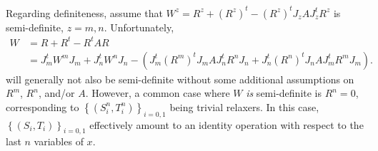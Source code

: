 \documentclass{article}
\begin{document}
Regarding definiteness, assume that $W^z = R^z + \left( R^z \right)^t - \left( R^z \right)^t J_z A J_z^t R^z$ is semi-definite, $z = m,n$. Unfortunately,
\begin{align*}
W & = R + R^t - R^t A R \\
  & = J_m^t W^m J_m + J_n^t W^n J_n - \left( J_m^t \left( R^m \right)^t J_m A J_n^t R^n J_n + J_n^t \left( R^n \right)^t J_n A J_m^t R^m J_m \right).
\end{align*}
will generally not also be semi-definite without some additional assumptions on $R^m$, $R^n$, and/or $A$. However, a common case where $W$ \emph{is} semi-definite is $R^n = 0$, corresponding to $\left\{ \left( S^n_i, T^n_i \right) \right\}_{i = 0,1}$ being trivial relaxers. In this case, $\left\{ \left( S_i, T_i \right) \right\}_{i = 0,1}$ effectively amount to an identity operation with respect to the last $n$ variables of $x$.
\end{document}
